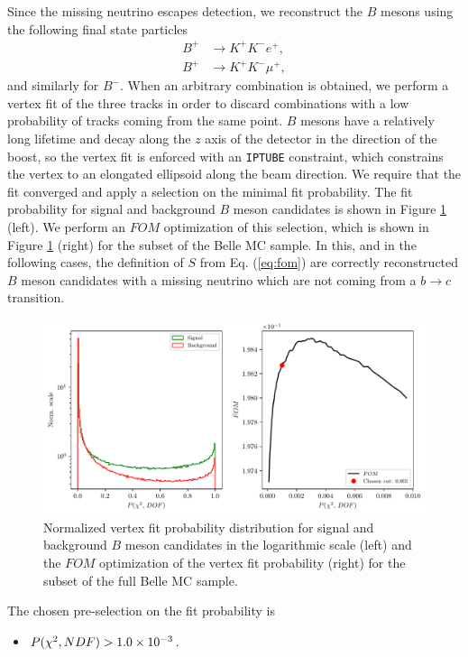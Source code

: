 Since the missing neutrino escapes detection, we reconstruct the $B$ mesons using the following final state particles
\begin{align*}
B^+ &\to K^+ K^- e^+, \\
B^+ &\to K^+ K^- \mu^+,
\end{align*}
and similarly for $B^-$. When an arbitrary combination is obtained, we perform a vertex fit of the three tracks in order to discard combinations with a low probability of tracks coming from the same point. $B$ mesons have a relatively long lifetime and decay along the $z$ axis of the detector in the direction of the boost, so the vertex fit is enforced with an \texttt{IPTUBE} constraint, which constrains the vertex to an elongated ellipsoid along the beam direction. We require that the fit converged and apply a selection on the minimal fit probability. The fit probability for signal and background $B$ meson candidates is shown in Figure \ref{fig:vtx} (left). We perform an $FOM$ optimization of this selection, which is shown in Figure \ref{fig:vtx} (right) for the subset of the Belle MC sample. In this, and in the following cases, the definition of $S$ from Eq. (\ref{eq:fom}) are correctly reconstructed $B$ meson candidates with a missing neutrino which are not coming from a $b \to c$ transition.

\begin{figure}[H]
	\centering
	\captionsetup{width=0.8\linewidth}
	\includegraphics[width=\linewidth]{fig/VTX}
	\caption{Normalized vertex fit probability distribution for signal and background $B$ meson candidates in the logarithmic scale (left) and the $FOM$ optimization of the vertex fit probability (right) for the subset of the full Belle MC sample.}
	\label{fig:vtx}
\end{figure}

The chosen pre-selection on the fit probability is
\begin{itemize}
	\item $P(\chi^2,NDF) > 1.0\times 10^{-3}$.

\end{itemize}

